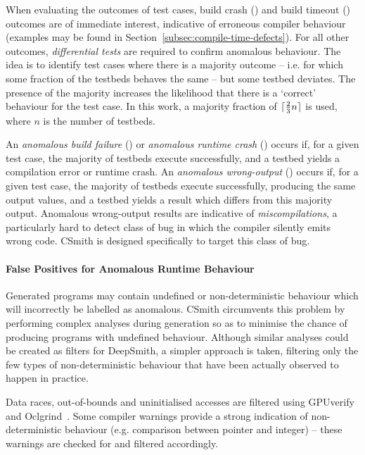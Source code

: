 \newpage
When evaluating the outcomes of test cases, build crash (\bc) and build timeout (\bto) outcomes are of immediate interest, indicative of erroneous compiler behaviour (examples may be found in Section~\ref{subsec:compile-time-defects}). For all other outcomes, \emph{differential tests} are required to confirm anomalous behaviour. The idea is to identify test cases where there is a majority outcome -- i.e. for which some fraction of the testbeds behaves the same -- but some testbed deviates. The presence of the majority increases the likelihood that there is a `correct' behaviour for the test case. In this work, a majority fraction of $\lceil\frac{2}{3}n\rceil$ is used, where $n$ is the number of testbeds.

An \emph{anomalous build failure} (\abf) or \emph{anomalous runtime crash} (\arc) occurs if, for a given test case, the majority of testbeds execute successfully, and a testbed yields a compilation error or runtime crash. An \emph{anomalous wrong-output} (\awo) occurs if, for a given test case, the majority of testbeds execute successfully, producing the same output values, and a testbed yields a result which differs from this majority output. Anomalous wrong-output results are indicative of \emph{miscompilations}, a particularly hard to detect class of bug in which the compiler silently emits wrong code. CSmith is designed specifically to target this class of bug.


\paragraph*{False Positives for Anomalous Runtime Behaviour}

Generated programs may contain undefined or non-deterministic behaviour which will incorrectly be labelled as anomalous. CSmith circumvents this problem by performing complex analyses during generation so as to minimise the chance of producing programs with undefined behaviour. Although similar analyses could be created as filters for DeepSmith, a simpler approach is taken, filtering only the few types of non-deterministic behaviour that have been actually observed to happen in practice.

Data races, out-of-bounds and uninitialised accesses are filtered using GPUverify~\cite{Betts2012} and Oclgrind~\cite{Price2015}. Some compiler warnings provide a strong indication of non-deterministic behaviour (e.g. comparison between pointer and integer) -- these warnings are checked for and filtered accordingly.

